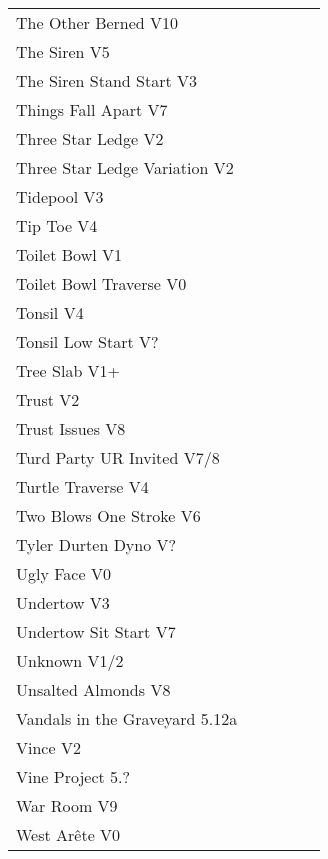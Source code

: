 \begin{flushleft}
\begin{center}
\begin{supertabular}{p{0.76\linewidth}p{0.08\linewidth}}
The Other Berned V10 & \pageref{rt:The Other Berned} \\
The Siren V5 & \pageref{rt:The Siren} \\
The Siren Stand Start V3 & \pageref{vr:The Siren Stand Start} \\
Things Fall Apart V7 & \pageref{rt:PA 2} \\
Three Star Ledge V2 & \pageref{rt:Three Star Ledge} \\
Three Star Ledge Variation V2 & \pageref{vr:Three Star Ledge Variation} \\
Tidepool V3 & \pageref{rt:Tidepool} \\
Tip Toe V4 & \pageref{rt:Tip Toe} \\
Toilet Bowl V1 & \pageref{rt:Toilet Bowl} \\
Toilet Bowl Traverse V0 & \pageref{rt:Toilet Bowl Traverse} \\
Tonsil V4 & \pageref{rt:Tonsil} \\
Tonsil Low Start V? & \pageref{vr:Tonsil Low Start} \\
Tree Slab V1+ & \pageref{rt:Tree Slab} \\
Trust V2 & \pageref{rt:Trust} \\
Trust Issues V8 & \pageref{rt:Trust Issues} \\
Turd Party UR Invited V7/8 & \pageref{rt:Turd Party UR Invited} \\
Turtle Traverse V4 & \pageref{vr:Turtle Traverse} \\
Two Blows One Stroke V6 & \pageref{rt:Two Blows One Stroke} \\
Tyler Durten Dyno V? & \pageref{vr:Tyler Durten Dyno} \\
Ugly Face V0 & \pageref{rt:Ugly Face} \\
Undertow V3 & \pageref{rt:Undertow} \\
Undertow Sit Start V7 & \pageref{vr:Undertow Sit Start} \\
Unknown V1/2 & \pageref{rt:Unknown on E's Dirty B} \\
Unsalted Almonds V8 & \pageref{rt:Unsalted Almonds} \\
Vandals in the Graveyard 5.12a & \pageref{rt:Vandals in the Graveyard} \\
Vince V2 & \pageref{rt:Vince} \\
Vine Project 5.? & \pageref{rt:Vine Project} \\
War Room V9 & \pageref{rt:War Room} \\
West Arête V0 & \pageref{rt:West Arête} \\

\end{supertabular}
\end{center}
\end{flushleft}
